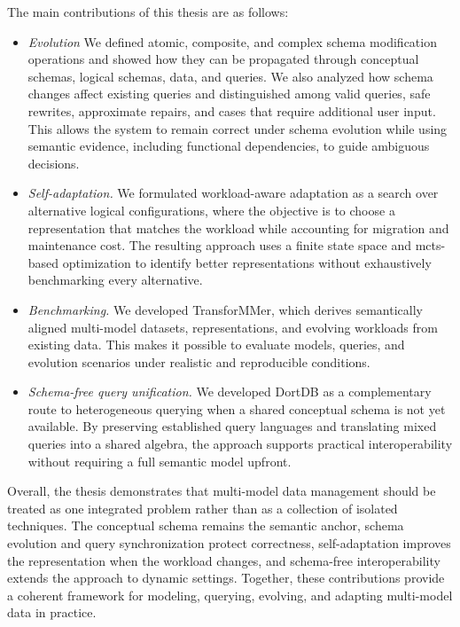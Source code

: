 The main contributions of this thesis are as follows:
\begin{itemize}
    \item \emph{Evolution} We defined atomic, composite, and complex schema modification operations and showed how they can be propagated through conceptual schemas, logical schemas, data, and queries. We also analyzed how schema changes affect existing queries and distinguished among valid queries, safe rewrites, approximate repairs, and cases that require additional user input. This allows the system to remain correct under schema evolution while using semantic evidence, including functional dependencies, to guide ambiguous decisions.
    \item \emph{Self-adaptation.} We formulated workload-aware adaptation as a search over alternative logical configurations, where the objective is to choose a representation that matches the workload while accounting for migration and maintenance cost. The resulting approach uses a finite state space and \acrshort{mcts}-based optimization to identify better representations without exhaustively benchmarking every alternative.
    \item \emph{Benchmarking.} We developed TransforMMer, which derives semantically aligned multi-model datasets, representations, and evolving workloads from existing data. This makes it possible to evaluate models, queries, and evolution scenarios under realistic and reproducible conditions.
    \item \emph{Schema-free query unification.} We developed DortDB as a complementary route to heterogeneous querying when a shared conceptual schema is not yet available. By preserving established query languages and translating mixed queries into a shared algebra, the approach supports practical interoperability without requiring a full semantic model upfront.
\end{itemize}

Overall, the thesis demonstrates that multi-model data management should be treated as one integrated problem rather than as a collection of isolated techniques. The conceptual schema remains the semantic anchor, schema evolution and query synchronization protect correctness, self-adaptation improves the representation when the workload changes, and schema-free interoperability extends the approach to dynamic settings. Together, these contributions provide a coherent framework for modeling, querying, evolving, and adapting multi-model data in practice.

